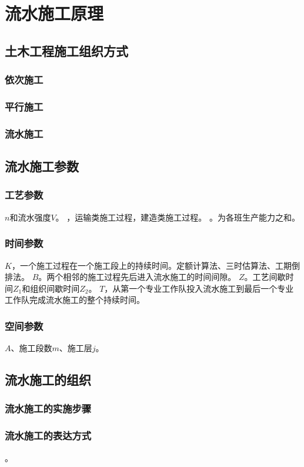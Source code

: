 \documentclass{book}
\begin{document}
\chapter{流水施工原理}
\section{土木工程施工组织方式}
\subsection{依次施工}
\subsection{平行施工}
\subsection{流水施工}
\section{流水施工参数}
\subsection{工艺参数}
$n$和流水强度$V$。
，运输类施工过程，建造类施工过程。
。为各班生产能力之和。
\subsection{时间参数}
$K$，一个施工过程在一个施工段上的持续时间。定额计算法、三时估算法、工期倒排法。
$B$。两个相邻的施工过程先后进入流水施工的时间间隙。
$Z$。工艺间歇时间$Z_1$和组织间歇时间$Z_2$。
$T$，从第一个专业工作队投入流水施工到最后一个专业工作队完成流水施工的整个持续时间。
\subsection{空间参数}
$A$、施工段数$m$、施工层$j$。
\section{流水施工的组织}
\subsection{流水施工的实施步骤}
\subsection{流水施工的表达方式}
。
\end{document}
